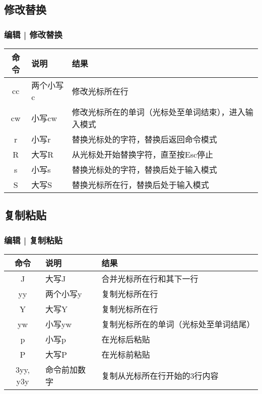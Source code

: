 \subsection{修改替换}
\begin{frame}
  \frametitle{编辑 | \alert{修改替换}}
  \begin{table}
    \centering
    \begin{tabularx}{0.9\textwidth}{clX}
      \hline
      \rowcolor{blue!50}命令 & 说明 & 结果\\
      \hline
      cc & 两个小写c & 修改光标所在行\\
      cw & 小写cw & 修改光标所在的单词（光标处至单词结束），进入输入模式\\
      r & 小写r & 替换光标处的字符，替换后返回命令模式\\
      R & 大写R & 从光标处开始替换字符，直至按Esc停止\\
      s & 小写s & 替换光标处的字符，替换后处于输入模式\\
      S & 大写S & 替换光标所在行，替换后处于输入模式\\
      \hline
    \end{tabularx}
  \end{table}
\end{frame}

\subsection{复制粘贴}
\begin{frame}
  \frametitle{编辑 | \alert{复制粘贴}}
  \begin{table}
    \centering
    \begin{tabularx}{0.9\textwidth}{clX}
      \hline
      \rowcolor{blue!50}命令 & 说明 & 结果\\
      \hline
      J & 大写J & 合并光标所在行和其下一行\\
      \hline
      yy & 两个小写y & 复制光标所在行\\
      Y & 大写Y & 复制光标所在行\\
      yw & 小写yw & 复制光标所在的单词（光标处至单词结尾）\\
      \hline
      p & 小写p & 在光标后粘贴\\
      P & 大写P & 在光标前粘贴\\
      \hline
      3yy, y3y & 命令前加数字 & 复制从光标所在行开始的3行内容\\
      \hline
    \end{tabularx}
  \end{table}
\end{frame}

